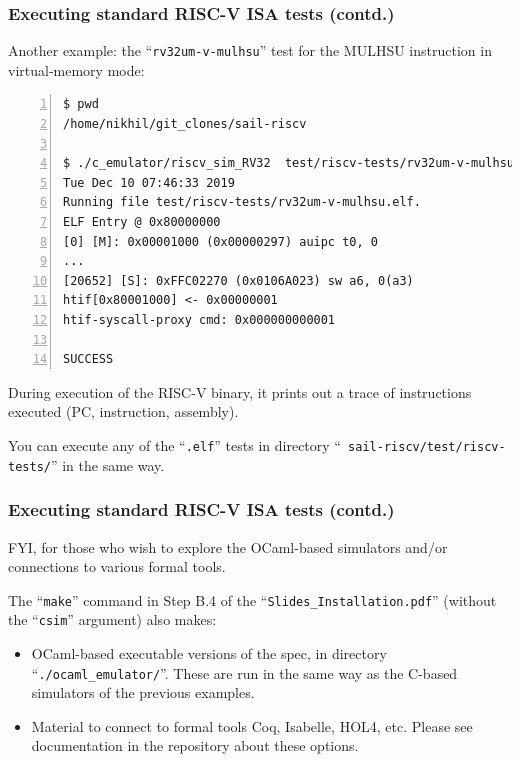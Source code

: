 \documentclass[aspectratio=169]{beamer}
\newcommand{\slidefont}{\scriptsize}
\newcommand{\cf}{\scriptsize\tt}
\begin{document}
\begin{frame}[fragile]
  \frametitle{Executing standard RISC-V ISA tests (contd.)}

  \slidefont

  Another example: the ``{\tt rv32um-v-mulhsu}'' test for the MULHSU
  instruction in virtual-memory mode:

  \vspace{1ex}

  \tiny
  \begin{Verbatim}[frame=single, numbers=left, label = in your sail-riscv repository clone]
$ pwd
/home/nikhil/git_clones/sail-riscv

$ ./c_emulator/riscv_sim_RV32  test/riscv-tests/rv32um-v-mulhsu.elf
Tue Dec 10 07:46:33 2019
Running file test/riscv-tests/rv32um-v-mulhsu.elf.
ELF Entry @ 0x80000000
[0] [M]: 0x00001000 (0x00000297) auipc t0, 0
...
[20652] [S]: 0xFFC02270 (0x0106A023) sw a6, 0(a3)
htif[0x80001000] <- 0x00000001
htif-syscall-proxy cmd: 0x000000000001

SUCCESS
  \end{Verbatim}

  \slidefont
  During execution of the RISC-V binary, it prints out a trace of instructions executed (PC, instruction, assembly).

  \vspace{1ex}

  You can execute any of the ``{\tt *.elf}'' tests in directory ``{\tt
    sail-riscv/test/riscv-tests/}'' in the same way.

\end{frame}


\begin{frame}[fragile]
  \frametitle{Executing standard RISC-V ISA tests (contd.)}

  \slidefont

  FYI, for those who wish to explore the OCaml-based simulators and/or
  connections to various formal tools.

  \vspace{5ex}

  The ``{\cf make}'' command in Step B.4 of the
  ``{\tt Slides\_Installation.pdf}'' (without the ``{\tt csim}''
  argument) also makes:

  \begin{itemize}
    \item OCaml-based executable versions of the spec, in directory
      ``{\tt ./ocaml\_emulator/}''.  These are run in the same way as
      the C-based simulators of the previous examples.

    \item Material to connect to formal tools Coq, Isabelle, HOL4,
      etc.  Please see documentation in the repository about these
      options.

  \end{itemize}

\end{frame}
\end{document}
